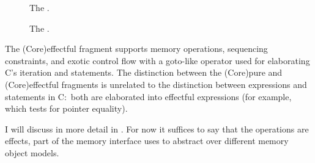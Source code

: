 \begin{figure}[tp]
    \ContinuedFloat*
    \raggedright%
    \small%
    \cngrammarcompressed{\textwidth}{%
        \cnpce{}\cninterrule{}
        \cnname{}\cninterrule{}
        \cncpat{}\cninterrule{}
        \cnctor{}\cnafterlastrule{}
    }
    \caption{The .}\label{fig:pure-core-grammar}
\end{figure}

\begin{figure}[tp]
    \ContinuedFloat{}
    \raggedright%
    \small%
    \cngrammarcompressed{\textwidth}{%
        \cncore{}\cninterrule{}
        \cncoreXXctxt{}\cninterrule{}
        \cncmemop{}\cninterrule{}
        \cncaction{}\cnafterlastrule{}
    }
    \caption{The .}\label{fig:effectful-core-grammar}
\end{figure}

The \kl(Core){effectful fragment} supports memory operations, sequencing constraints,
and exotic control flow with a goto-like operator used for elaborating
C's iteration and  statements. The distinction between the \kl(Core){pure}
and \kl(Core){effectful fragments} is unrelated to the distinction between expressions and
statements in C:\ both are elaborated into effectful expressions (for example,
 which tests for pointer equality).

I will discuss  in more detail in
. For now it suffices to say that the
operations are effects, part of the memory interface  uses to abstract
over different memory object models.

